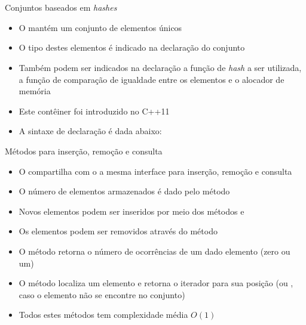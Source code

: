 \section{}

\begin{frame}[fragile]{Conjuntos baseados em {\it hashes}} 

    \begin{itemize}
        \item O  mantém um conjunto de elementos únicos

        \item O tipo  destes elementos é indicado na declaração do conjunto

        \item Também podem ser indicados na declaração a função de \textit{hash} a ser utilizada,
            a função de comparação de igualdade entre os elementos e o alocador de memória

        \item Este contêiner foi introduzido no C++11
    
        \item A sintaxe de declaração é dada abaixo:
    \end{itemize}
\end{frame}

\begin{frame}[fragile]{Métodos para inserção, remoção e consulta}

    \begin{itemize}
        \item O  compartilha com o  a mesma interface para 
            inserção, remoção e consulta 

        \item O número de elementos armazenados é dado pelo método 

        \item Novos elementos podem ser inseridos por meio dos métodos  e

        \item Os elementos podem ser removidos através do método 

        \item O método  retorna o número de ocorrências de um dado elemento
            (zero ou um)

        \item O método  localiza um elemento e retorna o iterador para sua
            posição (ou , caso o elemento não se encontre no conjunto)

        \item Todos estes métodos tem complexidade média $O(1)$
    \end{itemize}

\end{frame}

